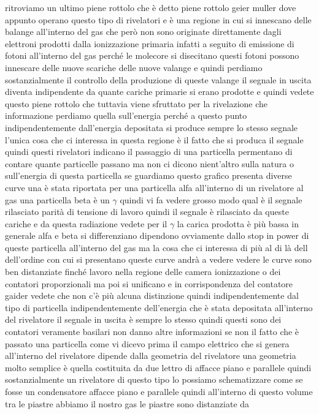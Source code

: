 {ritroviamo un ultimo piene rottolo che è detto piene rottolo geier muller dove appunto operano questo tipo di rivelatori e è una regione in cui si innescano delle balange all'interno del gas che però non sono originate direttamente dagli elettroni prodotti dalla ionizzazione primaria infatti a seguito di emissione di fotoni all'interno del gas perché le molecore si disecitano questi fotoni possono innescare delle nuove scariche delle nuove valange e quindi perdiamo sostanzialmente il controllo della produzione di queste valange il segnale in uscita diventa indipendente da quante cariche primarie si erano prodotte e quindi vedete questo piene rottolo che tuttavia viene sfruttato per la rivelazione che informazione perdiamo quella sull'energia perché a questo punto indipendentemente dall'energia depositata si produce sempre lo stesso segnale l'unica cosa che ci interessa in questa regione è il fatto che si produca il segnale quindi questi rivelatori indicano il passaggio di una particella permentano di contare quante particelle passano ma non ci dicono nient'altro sulla natura o sull'energia di questa particella se guardiamo questo grafico presenta diverse curve una è stata riportata per una particella alfa all'interno di un rivelatore al gas una particella beta è un $\gamma$ quindi vi fa vedere grosso modo qual è il segnale rilasciato parità di tensione di lavoro quindi il segnale è rilasciato da queste cariche e da questa radiazione vedete per il $\gamma$ la carica prodotta è più bassa in generale alfa e beta si differenziano dipendono ovviamente dallo stop in power di queste particella all'interno del gas ma la cosa che ci interessa di più al di là dell dell'ordine con cui si presentano queste curve andrà a vedere vedere le curve sono ben distanziate finché lavoro nella regione delle camera ionizzazione o dei contatori proporzionali ma poi si unificano e in corrispondenza del contatore gaider vedete che non c'è più alcuna distinzione quindi indipendentemente dal tipo di particella indipendentemente dell'energia che è stata depositata all'interno del rivelatore il segnale in uscita è sempre lo stesso quindi questi sono dei contatori veramente basilari non danno altre informazioni se non il fatto che è passato una particella come vi dicevo prima il campo elettrico che si genera all'interno del rivelatore dipende dalla geometria del rivelatore una geometria molto semplice è quella costituita da due lettro di affacce piano e parallele quindi sostanzialmente un rivelatore di questo tipo lo possiamo schematizzare come se fosse un condensatore affacce piano e parallele quindi all'interno di questo volume tra le piastre abbiamo il nostro gas le piastre sono distanziate da 

}
